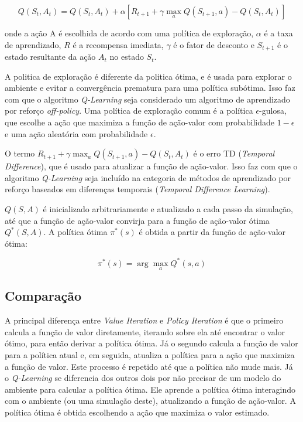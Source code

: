 \begin{equation}
    Q(S_t, A_t) = Q(S_t, A_t) + \alpha [R_{t+1} + \gamma \max_{a} Q(S_{t+1}, a) - Q(S_t, A_t)]
\end{equation}

onde a ação A é escolhida de acordo com uma política de exploração, $\alpha$ é a taxa de aprendizado, $R$ é a recompensa imediata, $\gamma$ é o fator de desconto e $S_{t+1}$ é o estado resultante da ação $A_t$ no estado $S_t$. 

A politica de exploração é diferente da politica ótima, e é usada para explorar o ambiente e evitar a convergência prematura para uma política subótima. Isso faz com que o algoritmo \textit{Q-Learning} seja considerado um algoritmo de aprendizado por reforço \textit{off-policy}. Uma política de exploração comum é a política $\epsilon$-gulosa, que escolhe a ação que maximiza a função de ação-valor com probabilidade $1 - \epsilon$ e uma ação aleatória com probabilidade $\epsilon$.

O termo $R_{t+1} + \gamma \max_{a} Q(S_{t+1}, a) - Q(S_t, A_t)$ é o erro TD (\textit{Temporal Difference}), que é usado para atualizar a função de ação-valor. Isso faz com que o algoritmo \textit{Q-Learning} seja incluído na categoria de métodos de aprendizado por reforço baseados em diferenças temporais (\textit{Temporal Difference Learning}).

$Q(S, A)$ é inicializado arbitrariamente e atualizado a cada passo da simulação, até que a função de ação-valor convirja para a função de ação-valor ótima $Q^*(S, A)$. A política ótima $\pi^*(s)$ é obtida a partir da função de ação-valor ótima:

\begin{equation}
    \pi^*(s) = \arg\max_a Q^*(s, a)
\end{equation}

\subsection*{Comparação}

A principal diferença entre \textit{Value Iteration} e \textit{Policy Iteration} é que o primeiro calcula a função de valor diretamente, iterando sobre ela até encontrar o valor ótimo, para então derivar a política ótima. Já o segundo calcula a função de valor para a política atual e, em seguida, atualiza a política para a ação que maximiza a função de valor. Este processo é repetido até que a política não mude mais. Já o \textit{Q-Learning} se diferencia dos outros dois por não precisar de um modelo do ambiente para calcular a política ótima. Ele aprende a política ótima interagindo com o ambiente (ou uma simulação deste), atualizando a função de ação-valor. A política ótima é obtida escolhendo a ação que maximiza o valor estimado.